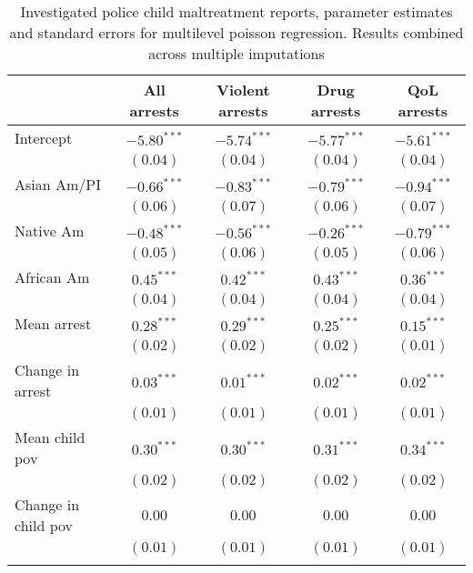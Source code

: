 
\begin{table}
\caption{Investigated police child maltreatment reports, parameter estimates and standard errors for multilevel poisson regression. Results combined across multiple imputations}
\begin{center}
\begin{tabular}{l c c c c }
\tiny{
\hline
 & All arrests & Violent arrests & Drug arrests & QoL arrests \\
\hline
Intercept                         & $-5.80^{***}$ & $-5.74^{***}$ & $-5.77^{***}$ & $-5.61^{***}$ \\
                                  & $(0.04)$      & $(0.04)$      & $(0.04)$      & $(0.04)$      \\
Asian Am/PI                       & $-0.66^{***}$ & $-0.83^{***}$ & $-0.79^{***}$ & $-0.94^{***}$ \\
                                  & $(0.06)$      & $(0.07)$      & $(0.06)$      & $(0.07)$      \\
Native Am                         & $-0.48^{***}$ & $-0.56^{***}$ & $-0.26^{***}$ & $-0.79^{***}$ \\
                                  & $(0.05)$      & $(0.06)$      & $(0.05)$      & $(0.06)$      \\
African Am                        & $0.45^{***}$  & $0.42^{***}$  & $0.43^{***}$  & $0.36^{***}$  \\
                                  & $(0.04)$      & $(0.04)$      & $(0.04)$      & $(0.04)$      \\
Mean arrest                       & $0.28^{***}$  & $0.29^{***}$  & $0.25^{***}$  & $0.15^{***}$  \\
                                  & $(0.02)$      & $(0.02)$      & $(0.02)$      & $(0.01)$      \\
Change in arrest                  & $0.03^{***}$  & $0.01^{***}$  & $0.02^{***}$  & $0.02^{***}$  \\
                                  & $(0.01)$      & $(0.01)$      & $(0.01)$      & $(0.01)$      \\
Mean child pov                    & $0.30^{***}$  & $0.30^{***}$  & $0.31^{***}$  & $0.34^{***}$  \\
                                  & $(0.02)$      & $(0.02)$      & $(0.02)$      & $(0.02)$      \\
Change in child pov               & $0.00$        & $0.00$        & $0.00$        & $0.00$        \\
                                  & $(0.01)$      & $(0.01)$      & $(0.01)$      & $(0.01)$      \\
}
\end{tabular}
\end{center}
\end{table}
